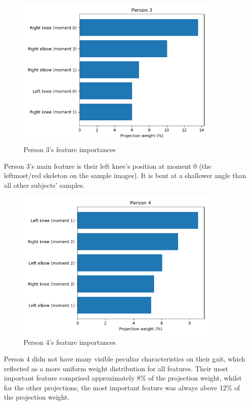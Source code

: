 \documentclass{bmvc2k}
\begin{document}
\begin{figure}[H]
   \begin{center}
      \includegraphics[width=10cm]{figures/person3Imp.png}
      \caption{Person 3's feature importances}
   \end{center}
\end{figure}
Person 3's main feature is their left knee's position at moment 0 (the leftmost/red skeleton on the sample images). It is bent at a shallower angle than all other subjects' samples.

\begin{figure}[H]
   \begin{center}
      \includegraphics[width=10cm]{figures/person4Imp.png}
      \caption{Person 4's feature importances}
   \end{center}
\end{figure}
Person 4 didn not have many visible peculiar characteristics on their gait, which reflected as a more uniform weight distribution for all features. Their most important feature comprised approximately 8\% of the projection weight, whilst for the other projections, the most important feature was always above 12\% of the projection weight.


\end{document}
